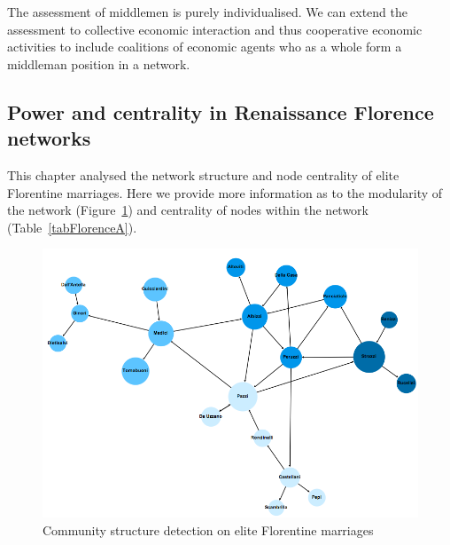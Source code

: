 The assessment of middlemen is purely individualised. We can extend the assessment to collective economic interaction and thus cooperative economic activities to include coalitions of economic agents who as a whole form a middleman position in a network.


\begin{subappendices}

\section{Power and centrality in Renaissance Florence networks} 
\label{A}

This chapter analysed the network structure and node centrality of elite Florentine marriages. Here we provide more information as to the modularity of the network (Figure~\ref{Fig:Florentinemodu}) and centrality of nodes within the network (Table~\ref{tabFlorenceA}).

\begin{figure}[h!]
\centering
\includegraphics[scale=0.4]{imgs/Florentine-modu.png}
\caption{Community structure detection on elite Florentine marriages}
\label{Fig:Florentinemodu}
\end{figure}


\end{subappendices}

